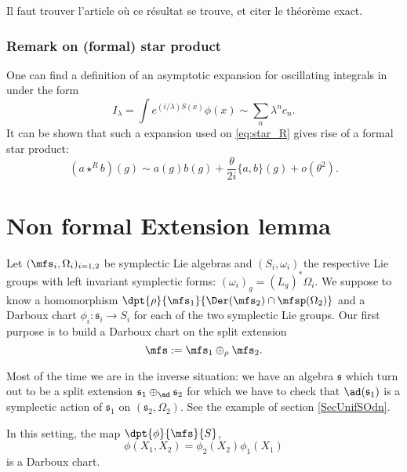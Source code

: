 \begin{probleme}
Il faut trouver l'article où ce résultat se trouve, et citer le théorème exact.
\label{ProbEnonSLdef}
\end{probleme}

\subsubsection{Remark on (formal) star product}\label{subsec:rem_on_sp}

One can  find a definition of an asymptotic expansion for oscillating integrals in \cite{Dieu7} under the form
\[
   I_{\lambda}=\int e^{(i/\lambda)S(x)}\phi(x)\sim\sum_n\lambda^nc_n.
\]
It can be shown that such a  expansion used on \eqref{eq:star_R} gives rise of a formal star product:
\begin{equation}    \label{EqDevFedFor}
(a\star^{R} b)(g)\sim a(g)b(g)+\frac{\theta}{2i}\{a,b\}(g)+o(\theta^2).
\end{equation}

\section{Non formal Extension lemma}        \label{SecExtLem}

Let $(\mfs_i,\Omega_i)_{i=1,2}$ be  symplectic Lie algebras and $(S_i,\omega_i)$ the respective Lie groups with left invariant symplectic forms: $(\omega_i)_g=(L_g)^*\Omega_i$. 
We suppose to know a homomorphism  $\dpt{\rho}{\mfs_1}{\Der(\mfs_2)\cap\mfsp(\Omega_2)}$ and a Darboux chart $\phi_i\colon \mathfrak{s}_i\to S_i$ for each of the two symplectic Lie groups. Our first purpose is to build a Darboux chart on the split extension
\[
   \mfs:=\mfs_1\oplus_{\rho}\mfs_2.
\]

\begin{remark}
Most of the time we are in the inverse situation: we have an algebra $\mathfrak{s}$ which turn out to be a split extension $\mathfrak{s}_{1}\oplus_{\ad}\mathfrak{s}_{2}$ for which we have to check that $\ad(\mathfrak{s}_{1})$ is a symplectic action of $\mathfrak{s}_{1}$ on $(\mathfrak{s}_{2},\Omega_{2})$. See the example of section \ref{SecUnifSOdn}.
\end{remark}
 
\begin{proposition}
In this setting, the map $\dpt{\phi}{\mfs}{S}$,
\begin{equation}
  \phi(X_1,X_2)=\phi_2(X_2)\phi_1(X_1)
\end{equation}
is a Darboux chart.
\label{prop:Darboux}
\end{proposition}

